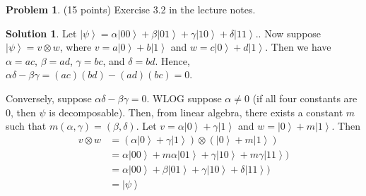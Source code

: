 \documentclass{article}
\theoremstyle{definition}
\newtheorem{problem}{Problem}
\newtheorem*{solution}{Solution}
\begin{document}
\begin{problem} (15 points)
Exercise 3.2 in the lecture notes.
\end{problem}
\begin{solution}
Let $\left| \psi \right\rangle = \alpha \left| 00 \right\rangle + \beta \left| 01 \right\rangle + \gamma \left| 10 \right\rangle + \delta \left| 11 \right\rangle.$.
Now suppose $\left| \psi \right\rangle = v \otimes w$, where $v = a \left| 0 \right\rangle + b \left| 1 \right\rangle$ and $w = c\left| 0 \right\rangle + d \left| 1 \right\rangle$.  Then we have $\alpha = ac$, $\beta = ad$, $\gamma = bc$, and $\delta = bd$.  Hence, $\alpha\delta - \beta\gamma = (ac)(bd) - (ad)(bc) = 0$.

Conversely, suppose $\alpha\delta - \beta\gamma = 0$. WLOG suppose $\alpha \neq 0$ (if all four constants are 0, then $\psi$ is decomposable). Then, from linear algebra, there exists a constant $m$ such that $m(\alpha, \gamma) = (\beta, \delta)$.  
Let $v = \alpha \left| 0 \right\rangle +  \gamma\left| 1 \right\rangle$ and $w =  \left| 0 \right\rangle + m \left| 1 \right\rangle$.
Then 
\begin{align*}
v \otimes w & = (\alpha \left| 0 \right\rangle +  \gamma\left| 1 \right\rangle) \otimes (\left| 0 \right\rangle + m \left| 1 \right\rangle) \\ 
& = \alpha \left| 00 \right\rangle + m\alpha \left| 01 \right\rangle + \gamma \left| 10 \right\rangle + m\gamma \left| 1 1 \right\rangle) \\
& = \alpha \left| 00 \right\rangle + \beta \left| 01 \right\rangle + \gamma \left| 10 \right\rangle + \delta \left| 1 1 \right\rangle) \\
& = \left| \psi \right\rangle
\end{align*}
\end{solution}
\end{document}
